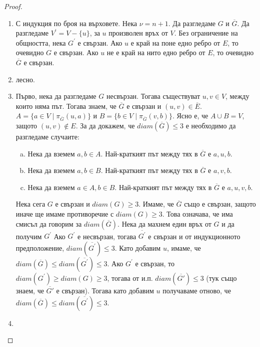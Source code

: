 \begin{proof}
  \begin{enumerate}
  \item
    С индукция по броя на върховете.
    Нека $\nu = n + 1$. Да разгледаме $G$ и $\overline{G}$.
    Да разгледаме $V^\prime = V - \{u\}$, за $u$ произволен връх от $V$.
    Без ограничение на общността, нека $G^\prime$ е свързан.
    Ако $u$ е край на поне едно ребро от $E$, то очевидно $G$ е свързан.
    Ако $u$ не е край на нито едно ребро от $E$, то очевидно $\overline{G}$ е свързан.
  \item
    лесно.
  \item
    Първо, нека да разгледаме $G$ несвързан.
    Тогава съществуват $u,v\in V$, между които няма път.
    Тогава знаем, че $\overline{G}$ е свързан и $(u,v)\in\overline{E}$.
    $A = \{a\in V\mid\pi_{\overline{G}}(u,a)\}$ и $B = \{b\in V\mid\pi_{\overline{G}}(v,b)\}$.
    Ясно е, че $A\cup B = V$, защото $(u,v)\not\in E$.
    За да докажем, че $diam(\overline{G})\leq 3$ е необходимо да разгледаме случаите:
    \begin{enumerate}[a)]
    \item
      Нека да вземем $a,b\in A$.
      Най-краткият път между тях в $\overline{G}$ е $a,u,b$.
    \item
      Нека да вземем $a,b\in B$.
      Най-краткият път между тях в $\overline{G}$ е $a,v,b$.
    \item
      Нека да вземем $a\in A,b\in B$.
      Най-краткият път между тях в $\overline{G}$ е $a,u,v,b$.
    \end{enumerate}
    
    Нека сега $G$ е свързан и $diam(G)\geq 3$.
    Имаме, че $\overline{G}$ също е свързан, защото иначе ще имаме противоречие с $diam(G)\geq 3$.
    Това означава, че има смисъл да говорим за $diam(\overline{G})$.
    Нека да махнем един връх от $G$ и да получим $G^\prime$
    Ако $G^\prime$ е несвързан, тогава $\overline{G^\prime}$ е свързан и от индукционното предположение, $diam(\overline{G^\prime})\leq 3$.
    Като добавим $u$, имаме, че $diam(\overline{G})\leq diam(\overline{G^\prime})\leq 3$.
    Ако $G^\prime$ е свързан, то $diam(G^\prime)\geq diam(G)\geq 3$, тогава от и.п. $diam(\overline{G'})\leq 3$ (тук също знаем, че $\overline{G'}$ е свързан). Тогава като добавим $u$ получаваме отново, че $diam(\overline{G})\leq diam(\overline{G^\prime})\leq 3$.
  \item
\end{enumerate}

\end{proof}


